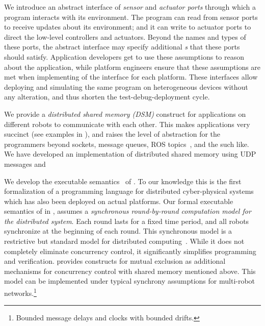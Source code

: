 \begin{noinditem}
\item We introduce an abstract interface of \emph{sensor} and \emph{actuator ports} through which a \lgname program interacts with its environment.
The program can read from sensor ports to receive updates about its environment;
and it can write to actuator ports to direct the low-level controllers and actuators.
Beyond the names and types of these ports, the abstract interface may specify additional \emph{\portasum{}s} that these ports should satisfy.
Application developers get to use these assumptions to reason about the \lgname application,
while platform engineers ensure that these assumptions are met when implementing of the interface for each platform.
These interfaces allow deploying and simulating the same \lgname program on heterogeneous devices without any alteration,
and thus shorten the test-debug-deployment cycle.

\item We provide a \emph{distributed shared memory (DSM)} construct for \lgname applications on different robots to communicate with each other.
This makes \lgname applications very succinct (see examples in ),
and raises the level of abstraction for the programmers beyond sockets, message queues, ROS topics~\cite{ros}, and the such like.
We have developed an implementation of distributed shared memory using UDP messages and 

\item We develop the executable \K semantics~\cite{rosu-serbanuta-2013-k} of \lgname.
To our knowledge this is the first formalization of a programming language for distributed cyber-physical systems which has also been deployed on actual platforms.
Our formal executable semantics of \lgname in \K, assumes a \emph{synchronous round-by-round computation model for the distributed system}.
Each round lasts for a fixed time period, and all robots synchronize at the beginning of each round.
This synchronous model is a restrictive but standard model for distributed computing~\cite{lynch1996a,attiyawelch}.
While it does not completely eliminate concurrency control, it significantly simplifies programming and verification.
\lgname provides constructs for mutual exclusion as additional mechanisms for concurrency control with shared memory mentioned above.
This model can be implemented under typical synchrony assumptions for multi-robot networks.\footnote{Bounded message delays and clocks with bounded drifts.}


\end{noinditem}
